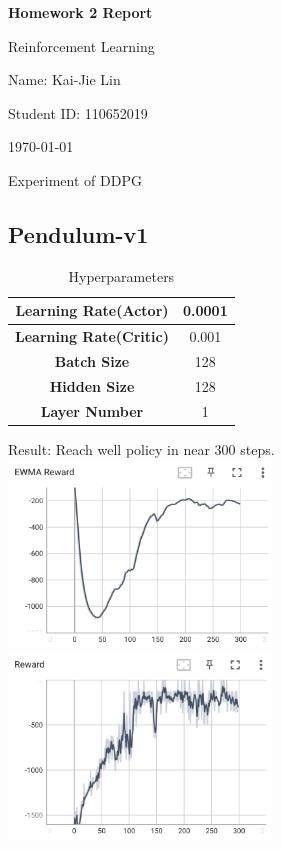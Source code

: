 \documentclass{article} %
\newcommand{\question}[2][]{\begin{flushleft}\textbf{Question #1}: \textit{#2}\end{flushleft}}
\newcommand{\maketitletwo}[2][]{\begin{center}
        \Large{\textbf{Homework 2 Report}
        
            Reinforcement Learning} %
        \vspace{5pt}
        
        \normalsize{
            Name: Kai-Jie Lin 
            
            Student ID: 110652019
            
            \today}
        \vspace{15pt}
        \end{center}}
\begin{document}
    \maketitletwo[5]  %

    \section{Experiment of DDPG}
    \subsection{Pendulum-v1}
    \begin{table}[h]
        \centering
        \begin{tabular}{|c|c|}
        \hline
        \textbf{Learning Rate(Actor)} & 0.0001 \\ \hline
        \textbf{Learning Rate(Critic)} & 0.001 \\ \hline
        \textbf{Batch Size} & 128 \\ \hline
        \textbf{Hidden Size} & 128 \\ \hline 
        \textbf{Layer Number} & 1 \\ \hline
        \end{tabular}
        \caption{Hyperparameters}
        \label{tab:ddpg_results}
    \end{table}
    Result: Reach well policy in near 300 steps.\\
    \includegraphics[width=7cm]{./imgs/pendulum/ewma_rw.png}
    \includegraphics[width=7cm]{./imgs/pendulum/rw.png} \\
\end{document}
